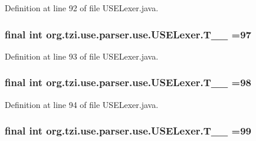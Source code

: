Definition at line 92 of file U\-S\-E\-Lexer.\-java.

\hypertarget{classorg_1_1tzi_1_1use_1_1parser_1_1use_1_1_u_s_e_lexer_a78fd070df9bfa99482cde213badcb313}{
\subsubsection[{T\-\_\-\-\_\-97}]{\setlength{\rightskip}{0pt plus 5cm}final int org.\-tzi.\-use.\-parser.\-use.\-U\-S\-E\-Lexer.\-T\-\_\-\-\_ =97\hspace{0.3cm}{\ttfamily [static]}}}\label{classorg_1_1tzi_1_1use_1_1parser_1_1use_1_1_u_s_e_lexer_a78fd070df9bfa99482cde213badcb313}


Definition at line 93 of file U\-S\-E\-Lexer.\-java.

\hypertarget{classorg_1_1tzi_1_1use_1_1parser_1_1use_1_1_u_s_e_lexer_a81168b1f87eb7db58687365c107f90de}{
\subsubsection[{T\-\_\-\-\_\-98}]{\setlength{\rightskip}{0pt plus 5cm}final int org.\-tzi.\-use.\-parser.\-use.\-U\-S\-E\-Lexer.\-T\-\_\-\-\_ =98\hspace{0.3cm}{\ttfamily [static]}}}\label{classorg_1_1tzi_1_1use_1_1parser_1_1use_1_1_u_s_e_lexer_a81168b1f87eb7db58687365c107f90de}


Definition at line 94 of file U\-S\-E\-Lexer.\-java.

\hypertarget{classorg_1_1tzi_1_1use_1_1parser_1_1use_1_1_u_s_e_lexer_a2f4d673830037930a0729893ae4fa587}{
\subsubsection[{T\-\_\-\-\_\-99}]{\setlength{\rightskip}{0pt plus 5cm}final int org.\-tzi.\-use.\-parser.\-use.\-U\-S\-E\-Lexer.\-T\-\_\-\-\_ =99\hspace{0.3cm}{\ttfamily [static]}}}\label{classorg_1_1tzi_1_1use_1_1parser_1_1use_1_1_u_s_e_lexer_a2f4d673830037930a0729893ae4fa587}


